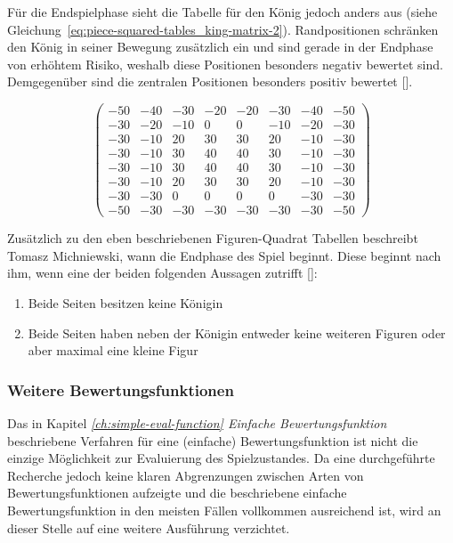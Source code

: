 \bigskip

\noindent Für die Endspielphase sieht die Tabelle für den König jedoch anders aus (siehe Gleichung~\ref{eq:piece-squared-tables_king-matrix-2}).
Randpositionen schränken den König in seiner Bewegung zusätzlich ein und sind gerade in der Endphase von erhöhtem Risiko, weshalb diese Positionen besonders negativ bewertet sind.
Demgegenüber sind die zentralen Positionen besonders positiv bewertet [\cite{Wiki2018}].

\begin{equation} \label{eq:piece-squared-tables_king-matrix-2}
\begin{pmatrix}
-50 & -40 & -30 & -20 & -20 & -30 & -40 & -50 \\
-30 & -20 & -10 & 0 & 0 & -10 & -20 & -30 \\
-30 & -10 & 20 & 30 & 30 & 20 & -10 & -30 \\
-30 & -10 & 30 & 40 & 40 & 30 & -10 & -30 \\
-30 & -10 & 30 & 40 & 40 & 30 & -10 & -30 \\
-30 & -10 & 20 & 30 & 30 & 20 & -10 & -30 \\
-30 & -30 & 0 & 0 & 0 & 0 & -30 & -30 \\
-50 & -30 & -30 & -30 & -30 & -30 & -30 & -50
\end{pmatrix}
\end{equation}

\bigskip

\noindent Zusätzlich zu den eben beschriebenen Figuren-Quadrat Tabellen beschreibt Tomasz Michniewski, wann die Endphase des Spiel beginnt.
Diese beginnt nach ihm, wenn eine der beiden folgenden Aussagen zutrifft [\cite{Wiki2018}]:

\begin{enumerate}
    \item Beide Seiten besitzen keine Königin
    \item Beide Seiten haben neben der Königin entweder keine weiteren Figuren oder aber maximal eine kleine Figur
\end{enumerate}


\subsubsection{Weitere Bewertungsfunktionen}

Das in Kapitel \textit{\ref{ch:simple-eval-function} Einfache Bewertungsfunktion} beschriebene Verfahren für eine (einfache) Bewertungsfunktion ist nicht die einzige Möglichkeit zur Evaluierung des Spielzustandes.
Da eine durchgeführte Recherche jedoch keine klaren Abgrenzungen zwischen Arten von Bewertungsfunktionen aufzeigte und die beschriebene einfache Bewertungsfunktion in den meisten Fällen vollkommen ausreichend ist, wird an dieser Stelle auf eine weitere Ausführung verzichtet.

